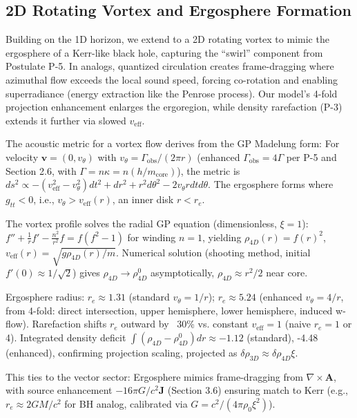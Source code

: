 \documentclass{article}
\begin{document}
\subsection{2D Rotating Vortex and Ergosphere Formation}

Building on the 1D horizon, we extend to a 2D rotating vortex to mimic the ergosphere of a Kerr-like black hole, capturing the ``swirl'' component from Postulate P-5. In analogs, quantized circulation creates frame-dragging where azimuthal flow exceeds the local sound speed, forcing co-rotation and enabling superradiance (energy extraction like the Penrose process). Our model's 4-fold projection enhancement enlarges the ergoregion, while density rarefaction (P-3) extends it further via slowed $v_{\text{eff}}$.

The acoustic metric for a vortex flow derives from the GP Madelung form: For velocity $\mathbf{v} = (0, v_\theta)$ with $v_\theta = \Gamma_{\text{obs}} / (2\pi r)$ (enhanced $\Gamma_{\text{obs}} = 4 \Gamma$ per P-5 and Section 2.6, with $\Gamma = n \kappa = n (h / m_{\text{core}})$), the metric is $ds^2 \propto - (v_{\text{eff}}^2 - v_\theta^2) dt^2 + dr^2 + r^2 d\theta^2 - 2 v_\theta r dt d\theta$. The ergosphere forms where $g_{tt} < 0$, i.e., $v_\theta > v_{\text{eff}}(r)$, an inner disk $r < r_e$.

The vortex profile solves the radial GP equation (dimensionless, $\xi = 1$): $f'' + \frac{1}{r} f' - \frac{n^2}{r^2} f = f (f^2 - 1)$ for winding $n=1$, yielding $\rho_{4D}(r) = f(r)^2$, $v_{\text{eff}}(r) = \sqrt{g \rho_{4D}(r) / m}$. Numerical solution (shooting method, initial $f'(0) \approx 1/\sqrt{2}$) gives $\rho_{4D} \to \rho_{4D}^0$ asymptotically, $\rho_{4D} \approx r^2 / 2$ near core.

Ergosphere radius: $r_e \approx 1.31$ (standard $v_\theta = 1/r$); $r_e \approx 5.24$ (enhanced $v_\theta = 4/r$, from 4-fold: direct intersection, upper hemisphere, lower hemisphere, induced w-flow). Rarefaction shifts $r_e$ outward by ~30\% vs. constant $v_{\text{eff}}=1$ (naive $r_e=1$ or 4). Integrated density deficit $\int (\rho_{4D} - \rho_{4D}^0) dr \approx -1.12$ (standard), -4.48 (enhanced), confirming projection scaling, projected as $\delta \rho_{3D} \approx \delta \rho_{4D} \xi$.

This ties to the vector sector: Ergosphere mimics frame-dragging from $\nabla \times \mathbf{A}$, with source enhancement $-16\pi G / c^2 \mathbf{J}$ (Section 3.6) ensuring match to Kerr (e.g., $r_e \approx 2 G M / c^2$ for BH analog, calibrated via $G = c^2 / (4\pi \rho_0 \xi^2)$).
\end{document}
